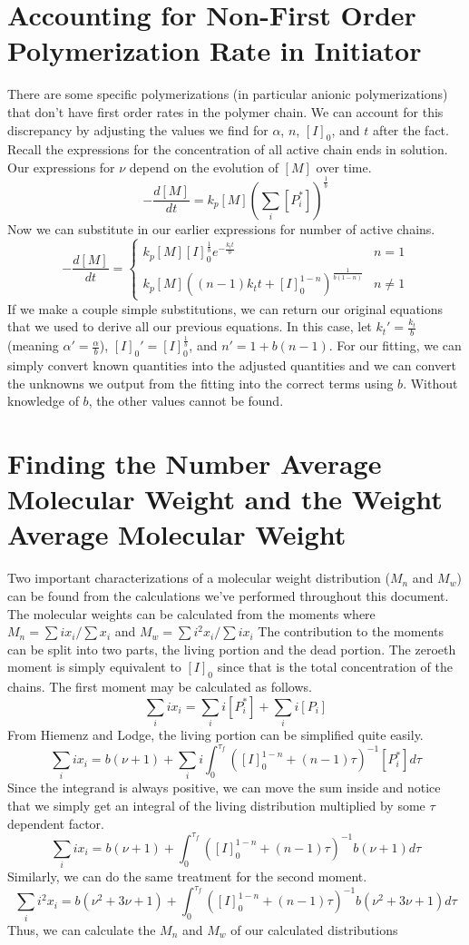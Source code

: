 \documentclass[12pt]{article}
\begin{document}
\section*{Accounting for Non-First Order Polymerization Rate in Initiator}
There are some specific polymerizations (in particular anionic polymerizations) that don't have first order rates in the polymer chain. We can account for this discrepancy by adjusting the values we find for $\alpha$, $n$, $[I]_0$, and $t$ after the fact. Recall the expressions for the concentration of all active chain ends in solution. Our expressions for $\nu$ depend on the evolution of $[M]$ over time.
\begin{equation}
  -\frac{d[M]}{dt}=k_p[M]\left(\sum_i[P_i^*]\right)^{\frac{1}{b}}
\end{equation}
Now we can substitute in our earlier expressions for number of active chains.
\begin{equation}
  -\frac{d[M]}{dt}=\begin{cases}
                     k_p[M][I]_0^{\frac{1}{b}}e^{-\frac{k_tt}{b}} & n=1\\
                     k_p[M]\left((n-1)k_tt+[I]_0^{1-n}\right)^{\frac{1}{b(1-n)}} & n\neq 1
                   \end{cases}
\end{equation}
If we make a couple simple substitutions, we can return our original equations that we used to derive all our previous equations. In this case, let $k_t'=\frac{k_t}{b}$ (meaning $\alpha'=\frac{\alpha}{b}$), $[I]_0'=[I]_0^{\frac{1}{b}}$, and $n'=1+b(n-1)$. For our fitting, we can simply convert known quantities into the adjusted quantities and we can convert the unknowns we output from the fitting into the correct terms using $b$. Without knowledge of $b$, the other values cannot be found.
\section*{Finding the Number Average Molecular Weight and the Weight Average Molecular Weight}
Two important characterizations of a molecular weight distribution ($M_n$ and $M_w$) can be found from the calculations we've performed throughout this document. The molecular weights can be calculated from the moments where $M_n = \sum ix_i / \sum x_i$ and $M_w = \sum i^2x_i / \sum ix_i$ The contribution to the moments can be split into two parts, the living portion and the dead portion. The zeroeth moment is simply equivalent to $[I]_0$ since that is the total concentration of the chains. The first moment may be calculated as follows.
$$\sum_i ix_i = \sum_i i[P_i^*] + \sum_i i[P_i]$$
From Hiemenz and Lodge, the living portion can be simplified quite easily.
$$\sum_i ix_i = b(\nu+1) + \sum_i i\int_{0}^{\tau_f}([I]_0^{1-n}+(n-1)\tau)^{-1}[P_i^*]d\tau$$
Since the integrand is always positive, we can move the sum inside and notice that we simply get an integral of the living distribution multiplied by some $\tau$ dependent factor.
$$\sum_i ix_i = b(\nu+1) + \int_{0}^{\tau_f}([I]_0^{1-n}+(n-1)\tau)^{-1}b(\nu+1)d\tau$$
Similarly, we can do the same treatment for the second moment.
$$\sum_i i^2x_i = b(\nu^2+3\nu+1) + \int_{0}^{\tau_f}([I]_0^{1-n}+(n-1)\tau)^{-1}b(\nu^2+3\nu+1)d\tau$$
Thus, we can calculate the $M_n$ and $M_w$ of our calculated distributions
\end{document}
